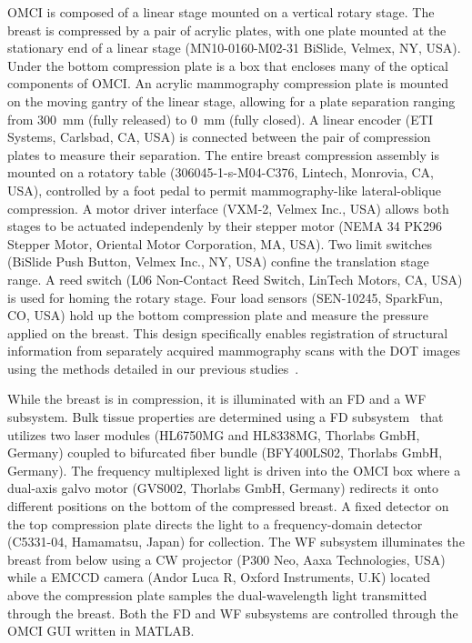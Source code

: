 \ac{OMCI} is composed of a linear stage mounted on a vertical rotary stage. The breast is compressed by a pair of acrylic plates, with one plate mounted at the stationary end of a linear stage (MN10-0160-M02-31 BiSlide, Velmex, NY, USA). Under the bottom compression plate is a box that encloses many of the optical components of \ac{OMCI}. An acrylic mammography compression plate is mounted on the moving gantry of the linear stage, allowing for a plate separation ranging from 300~mm (fully released) to 0~mm (fully closed). A linear encoder (ETI Systems, Carlsbad, CA, USA) is connected between the pair of compression plates to measure their separation. The entire breast compression assembly is mounted on a rotatory table (306045-1-s-M04-C376, Lintech, Monrovia, CA, USA), controlled by a foot pedal to permit mammography-like lateral-oblique compression. A motor driver interface (VXM-2, Velmex Inc., USA) allows both stages to be actuated independenly by their stepper motor (NEMA 34 PK296 Stepper Motor, Oriental Motor Corporation, MA, USA). Two limit switches (BiSlide Push Button, Velmex Inc., NY, USA) confine the translation stage range. A reed switch (L06 Non-Contact Reed Switch, LinTech Motors, CA, USA) is used for homing the rotary stage. Four load sensors (SEN-10245, SparkFun, CO, USA) hold up the bottom compression plate and measure the pressure applied on the breast.  This design specifically enables registration of structural information from separately acquired mammography scans with the \ac{DOT} images using the methods detailed in our previous studies~\cite{Deng2015}.

While the breast is in compression, it is illuminated with an \ac{FD} and a \ac{WF} subsystem. Bulk tissue properties are determined using a \ac{FD} subsystem~\cite{Zimmermann2016} that utilizes two laser modules (HL6750MG and HL8338MG, Thorlabs GmbH, Germany) coupled to bifurcated fiber bundle (BFY400LS02, Thorlabs GmbH, Germany). The frequency multiplexed light is driven into the \ac{OMCI} box where a dual-axis galvo motor (GVS002, Thorlabs GmbH, Germany) redirects it onto different positions on the bottom of the compressed breast. A fixed detector on the top compression plate directs the light to a frequency-domain detector (C5331-04, Hamamatsu, Japan) for collection. The \ac{WF} subsystem illuminates the breast from below using a \ac{CW} projector (P300 Neo, Aaxa Technologies, USA) while a \ac{EMCCD} camera (Andor Luca R, Oxford Instruments, U.K) located above the compression plate samples the dual-wavelength light transmitted through the breast. Both the \ac{FD} and \ac{WF} subsystems are controlled through the \ac{OMCI} \ac{GUI} written in MATLAB. 


